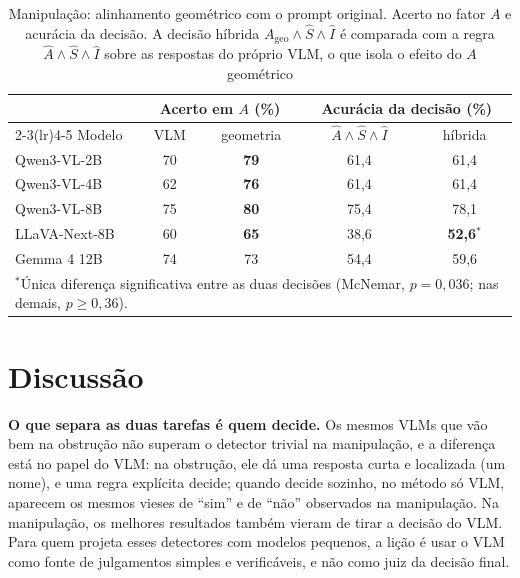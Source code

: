 \documentclass[conference]{IEEEtran}
\newcommand{\Ageo}{A_{\mathrm{geo}}}
\begin{document}
\begin{table}[!t]
\renewcommand{\arraystretch}{1.05}
\caption{Manipulação: alinhamento geométrico com o prompt original. Acerto no fator $A$ e acurácia da
decisão. A decisão híbrida $\Ageo\wedge\hat S\wedge\hat I$ é comparada com a regra
$\hat A\wedge\hat S\wedge\hat I$ sobre as respostas do próprio VLM, o que isola o efeito do $A$
geométrico}
\label{tab:c2}
\centering
\footnotesize
\setlength{\tabcolsep}{4pt}
\begin{tabular}{lcccc}
\toprule
 & \multicolumn{2}{c}{Acerto em $A$ (\%)} & \multicolumn{2}{c}{Acurácia da decisão (\%)} \\
\cmidrule(lr){2-3}\cmidrule(lr){4-5}
Modelo & VLM & geometria & $\hat A\wedge\hat S\wedge\hat I$ & híbrida \\
\midrule
Qwen3-VL-2B   & 70 & \textbf{79} & 61,4 & 61,4 \\
Qwen3-VL-4B   & 62 & \textbf{76} & 61,4 & 61,4 \\
Qwen3-VL-8B   & 75 & \textbf{80} & 75,4 & 78,1 \\
LLaVA-Next-8B & 60 & \textbf{65} & 38,6 & \textbf{52,6}$^{*}$ \\
Gemma 4 12B   & 74 & 73 & 54,4 & 59,6 \\
\bottomrule
\multicolumn{5}{L{7.4cm}}{\scriptsize $^{*}$Única diferença significativa entre as duas decisões
(McNemar, $p=0{,}036$; nas demais, $p\geq 0{,}36$).}
\end{tabular}
\end{table}

\section{Discussão}
\label{sec:disc}

\textbf{O que separa as duas tarefas é quem decide.} Os mesmos VLMs que vão bem na obstrução não
superam o detector trivial na manipulação, e a diferença está no papel do VLM: na obstrução, ele dá uma resposta curta e
localizada (um nome), e uma regra explícita decide; quando decide sozinho, no método só VLM, aparecem os
mesmos vieses de ``sim'' e de ``não'' observados na manipulação. Na manipulação, os melhores resultados
também vieram de tirar a decisão do VLM. Para quem projeta esses detectores com modelos pequenos, a
lição é usar o VLM como fonte de julgamentos simples e verificáveis, e não como juiz da decisão final.
\end{document}
